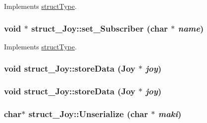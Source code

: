 Implements \hyperlink{classstructType_aa017fe323160d25667ed838023db944d}{structType}.

\hypertarget{classstruct__Joy_a322d144fc1e42403ceb40f1e7f2b8536}{
\subsubsection[{set\_\-Subscriber}]{\setlength{\rightskip}{0pt plus 5cm}void $\ast$ struct\_\-Joy::set\_\-Subscriber (char $\ast$ {\em name})}}
\label{classstruct__Joy_a322d144fc1e42403ceb40f1e7f2b8536}


Implements \hyperlink{classstructType_a2f5adefc54e1e0f5a9100ab78e3c3749}{structType}.

\hypertarget{classstruct__Joy_a4d15e99a2fd78d6f162d0831ab4549f1}{
\subsubsection[{storeData}]{\setlength{\rightskip}{0pt plus 5cm}void struct\_\-Joy::storeData ({\bf Joy} $\ast$ {\em joy})}}
\label{classstruct__Joy_a4d15e99a2fd78d6f162d0831ab4549f1}
\hypertarget{classstruct__Joy_a4d15e99a2fd78d6f162d0831ab4549f1}{
\subsubsection[{storeData}]{\setlength{\rightskip}{0pt plus 5cm}void struct\_\-Joy::storeData ({\bf Joy} $\ast$ {\em joy})}}
\label{classstruct__Joy_a4d15e99a2fd78d6f162d0831ab4549f1}
\hypertarget{classstruct__Joy_a6ad749ee0383dde28696e7aeeb050d09}{
\subsubsection[{Unserialize}]{\setlength{\rightskip}{0pt plus 5cm}char$\ast$ struct\_\-Joy::Unserialize (char $\ast$ {\em maki})}}
\label{classstruct__Joy_a6ad749ee0383dde28696e7aeeb050d09}


